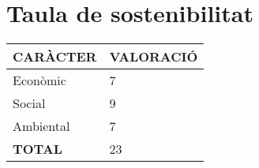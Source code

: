
\section{Taula de sostenibilitat}

\begin{center}
    \begin{tabular}{ | l | l |}
    \hline
	\textbf{CARÀCTER}								&\textbf{VALORACIÓ}		\\ \hline
    Econòmic										& 7						\\ \hline
    Social											& 9						\\ \hline
    Ambiental										& 7						\\ \hline
    \textbf{TOTAL}					 				& 23					\\ 
    \hline
    \end{tabular}
\end{center}
